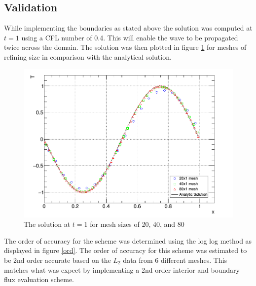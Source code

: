 \documentclass[paper=a4, fontsize=11pt, abstract=on]{scrartcl}
\numberwithin{equation}{section}		%
\numberwithin{figure}{section}			%
\numberwithin{table}{section}				%
\begin{document}
\subsection{Validation}
While implementing the boundaries as stated above the solution was computed at $t=1$ using a CFL number of 0.4. This will enable the wave to be propagated twice across the domain. The solution was then plotted in figure \ref{q4} for meshes of refining size in comparison with the analytical solution.

\begin{figure}[H]
\centering
\includegraphics[width=0.85\linewidth]{qq11}
\caption{The solution at $t=1$ for mesh sizes of 20, 40, and 80}
\label{q4}
\end{figure}

The order of accuracy for the scheme was determined using the log log method as displayed in figure \ref{ord}. The order of accuracy for this scheme was estimated to be 2nd order accurate based on the $L_2$ data from 6 different meshes. This matches what was expect by implementing a 2nd order interior and boundary flux evaluation scheme.
\end{document}
